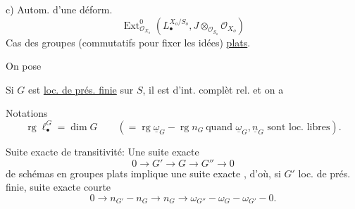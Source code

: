 c) Autom. d'une déform.
\[
\operatorname{Ext}^0_{\mathcal O_{X_o}}(L_\bullet^{X_o/S_o},J\otimes_{\mathcal O_{S_o}}\mathcal O_{X_o})
\]
Cas des groupes (commutatifs pour fixer les idées) \uline{plats}.

On pose

Si $G$ est \uline{loc. de prés. finie} sur $S$, il est d'int. complèt rel. et on a

Notations
\[
\operatorname{rg}\ell_\bullet^G=\dim G\qquad(=\operatorname{rg}\underline\omega_G-\operatorname{rg}n_G\ \text{quand }\underline\omega_G,\underline n_G\text{ sont loc. libres}).
\]

Suite exacte de transitivité: Une suite exacte
\[
0\longrightarrow G'\longrightarrow G\longrightarrow G''\longrightarrow0
\]
de schémas en groupes plats implique une suite exacte
,
d'où, si $G'$ loc. de prés. finie, suite exacte courte
\[
0\longrightarrow n_{G'}-n_G\longrightarrow n_G\longrightarrow\omega_{G''}-\omega_G-\omega_{G'}-0.
\]

